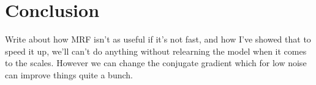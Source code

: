 \documentclass{article}
\begin{document}


\section{Conclusion}

Write about how MRF isn't as useful if it's not fast, and how I've 
showed that to speed it up, we'll can't do anything without relearning 
the model when it comes to the scales. However we can change the 
conjugate gradient which for low noise can improve things quite a bunch.

% 

% 

% 

% 

%
%  

% 




\end{document}
